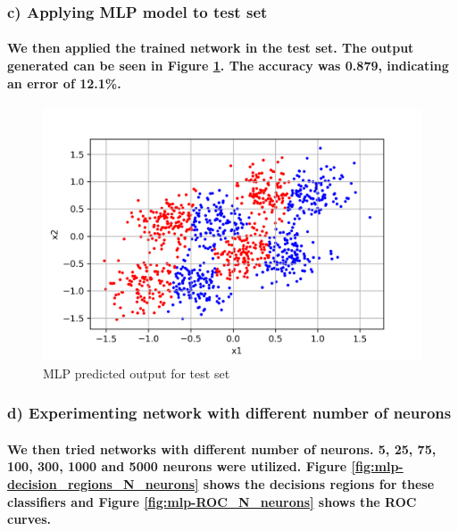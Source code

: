 \documentclass[a4paper]{article}    %
\begin{document}
\subsubsection{c) Applying MLP model to test set}

\paragraph{We then applied the trained network in the test set. The output generated can be seen in Figure \ref{fig:mlp-test_set_output}. The accuracy was 0.879, indicating an error of 12.1\%.}

\begin{figure}[H]
    \centering
    \includegraphics[width=12cm]{mlp_test_set_output}
    \caption{MLP predicted output for test set}
    \label{fig:mlp-test_set_output}
\end{figure}

\subsubsection{d) Experimenting network with different number of neurons}

\paragraph{We then tried networks with different number of neurons. 5, 25, 75, 100, 300, 1000 and 5000 neurons were utilized. Figure \ref{fig:mlp-decision_regions_N_neurons} shows the decisions regions for these classifiers and Figure \ref{fig:mlp-ROC_N_neurons} shows the ROC curves.}
\end{document}
